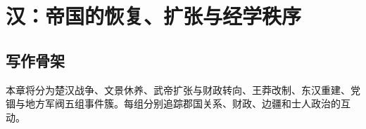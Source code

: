 \chapter{汉：帝国的恢复、扩张与经学秩序}
\section{写作骨架}
本章将分为楚汉战争、文景休养、武帝扩张与财政转向、王莽改制、东汉重建、党锢与地方军阀五组事件簇。每组分别追踪郡国关系、财政、边疆和士人政治的互动。
